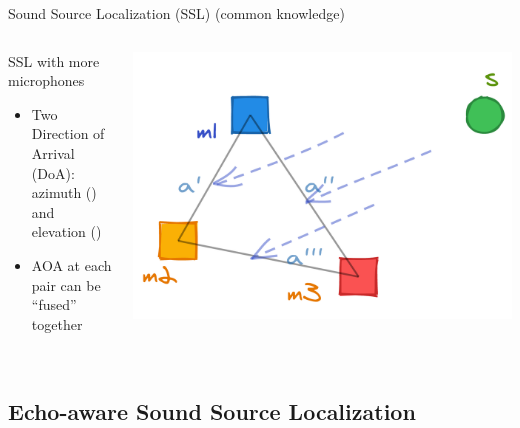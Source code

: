 \begin{frame}{Sound Source Localization (SSL) {\hfill\small (common knowledge)} \faBook}
    \begin{columns}[T,onlytextwidth]
        \begin{block}{SSL with more microphones}
            \begin{itemize}
                \item Two Direction of Arrival (DoA):
                \\azimuth (\faArrowsAltH) and elevation (\faArrowsAltV)
                \item AOA at each pair can be ``fused'' together
                \\
                \\\footnotemark[3]
            \end{itemize}
        \end{block}
        \includegraphics[width=\textwidth]{figures/2d_ssl.png}
    \end{columns}


\end{frame}

\subsection{Echo-aware Sound Source Localization}

